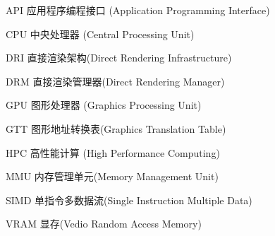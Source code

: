 \begin{denotation}

\item[API] 应用程序编程接口 (Application Programming Interface)
\item[CPU] 中央处理器 (Central Processing Unit)
\item[DRI]	直接渲染架构(Direct Rendering Infrastructure)
\item[DRM] 直接渲染管理器(Direct Rendering Manager)
\item[GPU] 图形处理器 (Graphics Processing Unit)
\item[GTT] 图形地址转换表(Graphics Translation Table)
\item[HPC] 高性能计算 (High Performance Computing)
\item[MMU] 内存管理单元(Memory Management Unit)
\item[SIMD] 单指令多数据流(Single Instruction Multiple Data)
\item[VRAM] 显存(Vedio Random Access Memory)
\end{denotation}
